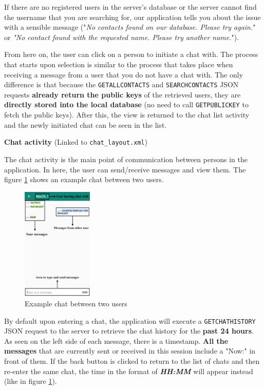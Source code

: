 If there are no registered users in the server's database or the server cannot find the username that you are searching for, our application tells you about the issue with a sensible message ("{\it{No contacts found on our database. Please try again.}}" or {\it{"No contact found with the requested name. Please try another name.}}").

From here on, the user can click on a person to initiate a chat with. The process that starts upon selection is similar to the process that takes place when receiving a message from a user that you do not have a chat with. The only difference is that because the \verb|GETALLCONTACTS| and \verb|SEARCHCONTACTS| JSON requests \textbf{already return the public keys} of the retrieved users, they are \textbf{directly stored into the local database} (no need to call \verb|GETPUBLICKEY| to fetch the public keys). After this, the view is returned to the chat list activity and the newly initiated chat can be seen in the list.

\textbf{Chat activity} (Linked to \verb|chat_layout.xml|)

The chat activity is the main point of communication between persons in the application. In here, the user can send/receive messages and view them. The figure \ref{chatExampleTwoUsers} shows an example chat between two users.

\begin{figure}[H]
 \centering
  \includegraphics[width=0.3\textwidth]{images/Chat.png}
  \caption{Example chat between two users}
  \label{chatExampleTwoUsers}
\end{figure}

By default upon entering a chat, the application will execute a \verb|GETCHATHISTORY| JSON request to the server to retrieve the chat history for the \textbf{past 24 hours}. As seen on the left side of each message, there is a timestamp. \textbf{All the messages} that are currently sent or received in this session include a "Now:" in front of them. If the back button is clicked to return to the list of chats and then re-enter the same chat, the time in the format of \textbf{{\it{HH:MM}}} will appear instead (like in figure \ref{chatExampleTwoUsers}).

